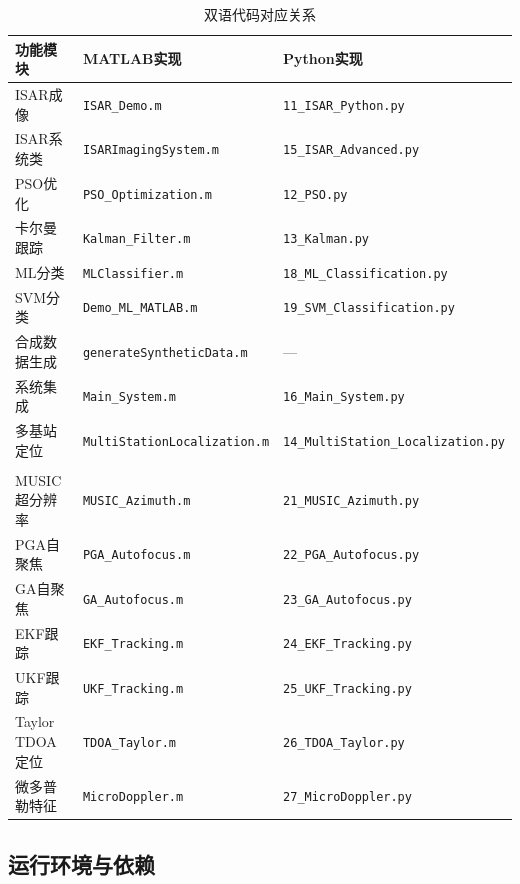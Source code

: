 \documentclass[12pt, a4paper]{article}
\begin{document}
\begin{table}[H]
\centering
\begin{tabularx}{\textwidth}{lLL}
\toprule
{}\color{white}\bfseries 功能模块 &
  \color{white}\bfseries MATLAB实现 &
  \color{white}\bfseries Python实现 \\
\midrule
ISAR成像 & \texttt{ISAR\_Demo.m} & \texttt{11\_ISAR\_Python.py} \\
ISAR系统类 & \texttt{ISARImagingSystem.m} & \texttt{15\_ISAR\_Advanced.py} \\
PSO优化 & \texttt{PSO\_Optimization.m} & \texttt{12\_PSO.py} \\
卡尔曼跟踪 & \texttt{Kalman\_Filter.m} & \texttt{13\_Kalman.py} \\
ML分类 & \texttt{MLClassifier.m} & \texttt{18\_ML\_Classification.py} \\
SVM分类 & \texttt{Demo\_ML\_MATLAB.m} & \texttt{19\_SVM\_Classification.py} \\
合成数据生成 & \texttt{generateSyntheticData.m} & --- \\
系统集成 & \texttt{Main\_System.m} & \texttt{16\_Main\_System.py} \\
多基站定位 & \texttt{\small MultiStationLocalization.m} & \texttt{\small 14\_MultiStation\_Localization.py} \\
 \\
MUSIC超分辨率 & \texttt{MUSIC\_Azimuth.m} & \texttt{21\_MUSIC\_Azimuth.py} \\
PGA自聚焦 & \texttt{PGA\_Autofocus.m} & \texttt{22\_PGA\_Autofocus.py} \\
GA自聚焦 & \texttt{GA\_Autofocus.m} & \texttt{23\_GA\_Autofocus.py} \\
EKF跟踪 & \texttt{EKF\_Tracking.m} & \texttt{24\_EKF\_Tracking.py} \\
UKF跟踪 & \texttt{UKF\_Tracking.m} & \texttt{25\_UKF\_Tracking.py} \\
Taylor TDOA定位 & \texttt{TDOA\_Taylor.m} & \texttt{26\_TDOA\_Taylor.py} \\
微多普勒特征 & \texttt{MicroDoppler.m} & \texttt{27\_MicroDoppler.py} \\
\bottomrule
\end{tabularx}
\caption{双语代码对应关系}
\label{tab:code}
\end{table}

\subsection{运行环境与依赖}
\end{document}
